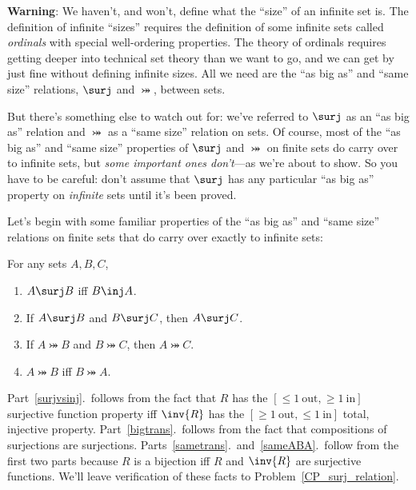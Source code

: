\textbf{Warning}: We haven't, and won't, define what the ``size'' of
an infinite set is.  The definition of infinite ``sizes'' requires the
definition of some infinite sets called \emph{ordinals} with special
well-ordering properties.  The theory of ordinals requires getting
deeper into technical set theory than we want to go, and we can get by
just fine without defining infinite sizes.  All we need are the ``as
big as'' and ``same size'' relations, $\surj$ and $\bij$, between
sets.

But there's something else to watch out for: we've referred to $\surj$
as an ``as big as'' relation and $\bij$ as a ``same size'' relation on
sets.  Of course, most of the ``as big as'' and ``same size''
properties of $\surj$ and $\bij$ on finite sets do carry over to
infinite sets, but \emph{some important ones don't}---as we're about
to show.  So you have to be careful: don't assume that $\surj$ has any
particular ``as big as'' property on \emph{infinite} sets until it's
been proved.

Let's begin with some familiar properties of the ``as big as'' and
``same size'' relations on finite sets that do carry over exactly to
infinite sets:
\begin{lemma}\label{surjinjbij_properties}
For any sets $A,B,C$,
\begin{enumerate}

\item \label{surjvsinj} $A \surj B$ iff $B \inj A$.

\item \label{bigtrans} If $A \surj B$ and $B \surj C$, then $A \surj
  C$.

\item \label{sametrans} If $A \bij B$ and $B \bij C$, then $A \bij C$.

\item\label{sameABA} $A \bij B$ iff $B \bij A$.
\end{enumerate}
\end{lemma}

Part~\ref{surjvsinj}.\ follows from the fact that $R$ has the $[\le
  1\ \text{out}, \ge 1\ \text{in}]$ surjective function property iff
$\inv{R}$ has the $[\ge 1\ \text{out}, \le 1\ \text{in}]$ total,
injective property.  Part~\ref{bigtrans}.\ follows from the fact that
compositions of surjections are surjections.
Parts~\ref{sametrans}.\ and~\ref{sameABA}.\ follow from the first two
parts because $R$ is a bijection iff $R$ and $\inv{R}$ are surjective
functions.  We'll leave verification of these facts to
Problem~\ref{CP_surj_relation}.


